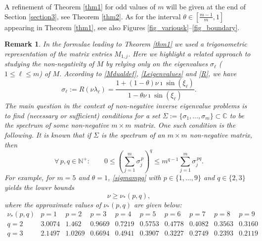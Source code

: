 \documentclass[a4paper]{article}
\newtheorem{remark}{Remark}
\newcommand{\te}{\theta}
\newcommand{\nplus}{\mathbb{N}^+}
\begin{document}
A refinement of Theorem \ref{thm1} for odd values of $m$ will be given at the end of Section \ref{section3}, see Theorem \ref{thm2}.
As for the interval $\theta\in\left[\frac{m-1}{m},1\right]$ appearing in Theorem \ref{thm1}, see also 
Figures \ref{fig_variousk}--\ref{fig_boundary}.


\begin{remark} 
In the formulae leading to Theorem \ref{thm1} we used a trigonometric representation of the matrix 
\emph{entries} $M_{1,j}$. Here we highlight a related approach to studying the non-negativity of $M$ by
relying only on the \emph{eigenvalues} $\sigma_\ell$ ($1\le \ell\le m$) of $M$. According to
\eqref{Mdualdef}, \eqref{Leigenvalues} and \eqref{R}, we have
\[
\sigma_\ell:=R(\nu\lambda_\ell)=\frac{1+ (1-\theta )\nu \imath \sin \left(\xi _\ell\right)}{1- \theta\nu \imath  \sin \left(\xi _\ell\right)}.
\]
The main question in the context of \emph{non-negative inverse eigenvalue problems} is to 
find (necessary or sufficient) conditions for a set $\Sigma:=\{\sigma_1,\ldots,\sigma_m\}\subset\mathbb{C}$ to be the spectrum of \emph{some} non-negative $m \times m$ matrix.
One such condition is the following. It is known \cite[Chapter 4]{nonnegmatr} that if $\Sigma$ is the spectrum of 
an $m \times m$ non-negative matrix, then 
\begin{equation}\label{sigmampq}
\forall\, p, q \in\nplus:\quad\quad 0\le \left(\sum_{j=1}^m \sigma_j^{\,p}\right)^q\le m^{q-1} \sum_{j=1}^m \sigma_j^{\,p q}.
\end{equation}
For example, for $m=5$ and $\te=1$, \eqref{sigmampq} with  $p\in\{1,\ldots,9\}$ and $q\in\{2,3\}$ yields the lower bounds
\begin{equation}\label{nustartpq}
\nu\ge \nu_{*}(p,q),
\end{equation}
where the approximate values of $\nu_{*}(p,q)$ are given below:
\[
\begin{array}{|c|c|c|c|c|c|c|c|c|c|}
\hline
\nu_{*}(p,q) & p=1 & p=2 & p=3 & p=4 & p=5 & p=6 & p=7 & p=8 & p=9 \\
\hline
q=2 & 3.0074 & 1.462 & 0.9669 & 0.7219 & 0.5753 & 0.4778 & 0.4082 & 0.3563 & 0.3160 \\
\hline
q=3 & 2.1497 & 1.0269 & 0.6694  & 0.4941 & 0.3907 & 0.3227  & 0.2749  & 0.2393  &  0.2119 \\

\end{array}\]
\end{remark}
\end{document}
